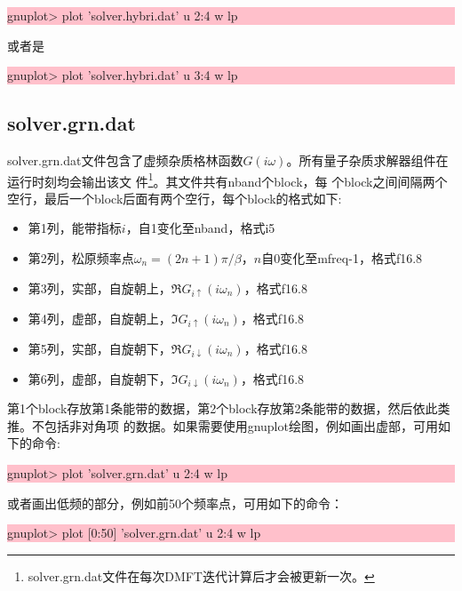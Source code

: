 \noindent\colorbox{pink}{\parbox[r]{\linewidth}{\quad gnuplot> plot 'solver.hybri.dat' u 2:4 w lp }}

或者是

\noindent\colorbox{pink}{\parbox[r]{\linewidth}{\quad gnuplot> plot 'solver.hybri.dat' u 3:4 w lp }}

\subsection{solver.grn.dat}
solver.grn.dat文件包含了虚频杂质格林函数$G(i\omega)$。所有量子杂质求解器组件在运行时刻均会输出该文
件\footnote{solver.grn.dat文件在每次DMFT迭代计算后才会被更新一次。}。其文件共有nband个block，每
个block之间间隔两个空行，最后一个block后面有两个空行，每个block的格式如下:
\begin{itemize}
\item 第1列，能带指标$i$，自1变化至nband，格式i5
\item 第2列，松原频率点$\omega_{n}=(2n+1)\pi/\beta$，$n$自0变化至mfreq-1，格式f16.8
\item 第3列，实部，自旋朝上，$\Re G_{i\uparrow}(i\omega_{n})$，格式f16.8
\item 第4列，虚部，自旋朝上，$\Im G_{i\uparrow}(i\omega_{n})$，格式f16.8
\item 第5列，实部，自旋朝下，$\Re G_{i\downarrow}(i\omega_{n})$，格式f16.8
\item 第6列，虚部，自旋朝下，$\Im G_{i\downarrow}(i\omega_{n})$，格式f16.8
\end{itemize}
第1个block存放第1条能带的数据，第2个block存放第2条能带的数据，然后依此类推。不包括非对角项
的数据。如果需要使用gnuplot绘图，例如画出虚部，可用如下的命令:

\noindent\colorbox{pink}{\parbox[r]{\linewidth}{\quad gnuplot> plot 'solver.grn.dat' u 2:4 w lp }}
或者画出低频的部分，例如前50个频率点，可用如下的命令：

\noindent\colorbox{pink}{\parbox[r]{\linewidth}{\quad gnuplot> plot [0:50] 'solver.grn.dat' u 2:4 w lp }}

